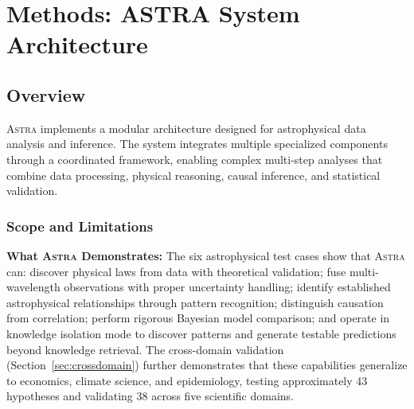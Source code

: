 \documentclass[usenatbib]{rasti}
\newcommand{\astra}{\textsc{Astra}\xspace}
\begin{document}
\section{Methods: ASTRA System Architecture}
\label{sec:methods}

\subsection{Overview}
\label{sec:methods:overview}

\astra implements a modular architecture designed for astrophysical data analysis and inference.
The system integrates multiple specialized components through a coordinated framework, enabling complex multi-step analyses that combine data processing, physical reasoning, causal inference, and statistical validation.

\subsubsection{Scope and Limitations}
\label{sec:scope}

\textbf{What \astra Demonstrates:}
The six astrophysical test cases show that \astra can: discover physical laws from data with theoretical validation; fuse multi-wavelength observations with proper uncertainty handling; identify established astrophysical relationships through pattern recognition; distinguish causation from correlation; perform rigorous Bayesian model comparison; and operate in knowledge isolation mode to discover patterns and generate testable predictions beyond knowledge retrieval.
The cross-domain validation (Section~\ref{sec:crossdomain}) further demonstrates that these capabilities generalize to economics, climate science, and epidemiology, testing approximately 43 hypotheses and validating 38 across five scientific domains.
\end{document}
